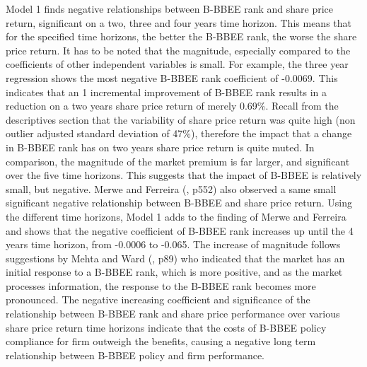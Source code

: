 Model 1 finds negative relationships between B-BBEE rank and share price return, significant on a two, three and four years time horizon. This means that for the specified time horizons, the better the B-BBEE rank, the worse the share price return. It has to be noted that the magnitude, especially compared to the coefficients of other independent variables is small. For example, the three year regression shows the most negative B-BBEE rank coefficient of -0.0069. This indicates that an 1 incremental improvement of B-BBEE rank results in a reduction on a two years share price return of merely 0.69\%. Recall from the descriptives section that the variability of share price return was quite high (non outlier adjusted standard deviation of 47\%), therefore the impact that a change in B-BBEE rank has on two years share price return is quite muted.  In comparison, the magnitude of the market premium is far larger, and significant over the five time horizons. This suggests that the impact of B-BBEE is relatively small, but negative. Merwe and Ferreira (\citeyear{N7}, p552) also observed a same small significant negative relationship between B-BBEE and share price return. Using the different time horizons, Model 1 adds to the finding of Merwe and Ferreira and shows that the negative coefficient of B-BBEE rank increases up until the 4 years time horizon, from -0.0006 to -0.065. The increase of magnitude follows suggestions by Mehta and Ward (\citeyear{N27}, p89) who indicated that the market has an initial response to a B-BBEE rank, which is more positive, and as the market processes information, the response to the B-BBEE rank becomes more pronounced. The negative increasing coefficient and significance of the relationship between B-BBEE rank and share price performance over various share price return time horizons indicate that the costs of B-BBEE policy compliance for firm outweigh the benefits, causing a negative long term relationship between B-BBEE policy and firm performance.

